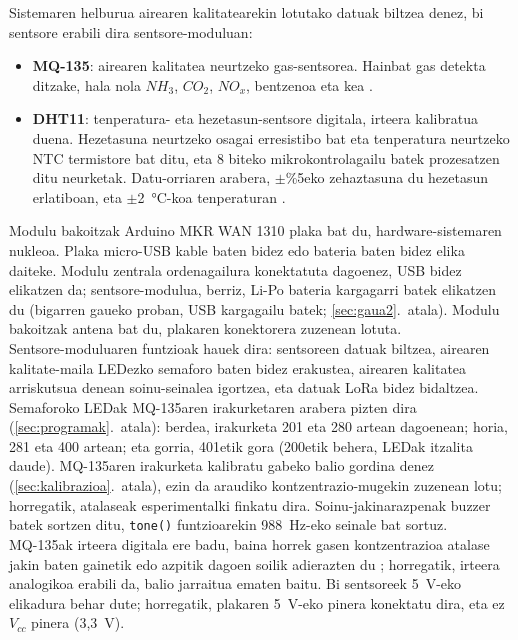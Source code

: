 \documentclass[10pt]{article}
\begin{document}
Sistemaren helburua airearen kalitatearekin lotutako datuak biltzea denez, bi sentsore erabili dira sentsore-moduluan:
\begin{itemize}
    \item \textbf{MQ-135}: airearen kalitatea neurtzeko gas-sentsorea. Hainbat gas detekta ditzake, hala nola $NH_3$, $CO_2$, $NO_x$, bentzenoa eta kea \cite{mq135_sensor}.
    \item \textbf{DHT11}: tenperatura- eta hezetasun-sentsore digitala, irteera kalibratua duena. Hezetasuna neurtzeko osagai erresistibo bat eta tenperatura neurtzeko \ac{NTC} termistore bat ditu, eta 8 biteko mikrokontrolagailu batek prozesatzen ditu neurketak. Datu-orriaren arabera, $\pm$\%5eko zehaztasuna du hezetasun erlatiboan, eta $\pm$2~°C-koa tenperaturan \cite{dht11datasheet}.
\end{itemize}

Modulu bakoitzak Arduino MKR WAN 1310 plaka bat du, hardware-sistemaren nukleoa. Plaka micro-\ac{USB} kable baten bidez edo bateria baten bidez elika daiteke. Modulu zentrala ordenagailura konektatuta dagoenez, \ac{USB} bidez elikatzen da; sentsore-modulua, berriz, \ac{Li-Po} bateria kargagarri batek elikatzen du (bigarren gaueko proban, \ac{USB} kargagailu batek; \ref{sec:gaua2}.~atala). Modulu bakoitzak antena bat du, plakaren konektorera zuzenean lotuta.\\

Sentsore-moduluaren funtzioak hauek dira: sentsoreen datuak biltzea, airearen kalitate-maila LEDezko semaforo baten bidez erakustea, airearen kalitatea arriskutsua denean soinu-seinalea igortzea, eta datuak \ac{LoRa} bidez bidaltzea. Semaforoko LEDak MQ-135aren irakurketaren arabera pizten dira (\ref{sec:programak}.~atala): berdea, irakurketa 201 eta 280 artean dagoenean; horia, 281 eta 400 artean; eta gorria, 401etik gora (200etik behera, LEDak itzalita daude). MQ-135aren irakurketa kalibratu gabeko balio gordina denez (\ref{sec:kalibrazioa}.~atala), ezin da araudiko kontzentrazio-mugekin zuzenean lotu; horregatik, atalaseak esperimentalki finkatu dira. Soinu-jakinarazpenak buzzer batek sortzen ditu, \texttt{tone()} funtzioarekin 988~Hz-eko seinale bat sortuz.\\

MQ-135ak irteera digitala ere badu, baina horrek gasen kontzentrazioa atalase jakin baten gainetik edo azpitik dagoen soilik adierazten du \cite{mq135_sensor}; horregatik, irteera analogikoa erabili da, balio jarraitua ematen baitu. Bi sentsoreek 5~V-eko elikadura behar dute; horregatik, plakaren 5~V-eko pinera konektatu dira, eta ez $V_{cc}$ pinera (3,3~V).\\
\end{document}

